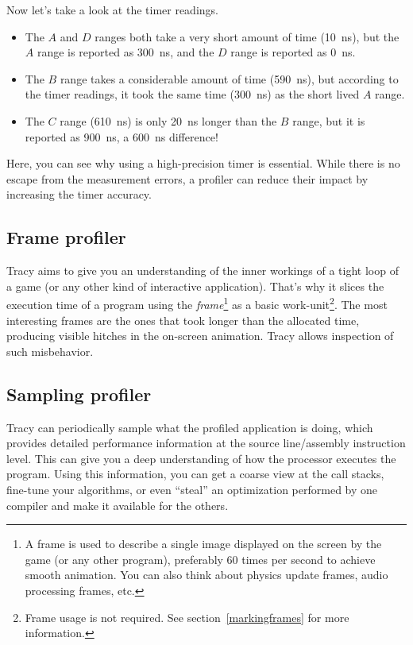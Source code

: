 \documentclass[hidelinks,titlepage,a4paper,twoside]{article}
\begin{document}
Now let's take a look at the timer readings.

\begin{itemize}
\item The $A$ and $D$ ranges both take a very short amount of time (10~\si{\nano\second}), but the $A$ range is reported as 300~\si{\nano\second}, and the $D$ range is reported as 0~\si{\nano\second}.
\item The $B$ range takes a considerable amount of time (590~\si{\nano\second}), but according to the timer readings, it took the same time (300~\si{\nano\second}) as the short lived $A$ range.
\item The $C$ range (610~\si{\nano\second}) is only 20~\si{\nano\second} longer than the $B$ range, but it is reported as 900~\si{\nano\second}, a 600~\si{\nano\second} difference!
\end{itemize}

Here, you can see why using a high-precision timer is essential. While there is no escape from the measurement errors, a profiler can reduce their impact by increasing the timer accuracy.

\subsection{Frame profiler}

Tracy aims to give you an understanding of the inner workings of a tight loop of a game (or any other kind of interactive application). That's why it slices the execution time of a program using the \emph{frame}\footnote{A frame is used to describe a single image displayed on the screen by the game (or any other program), preferably 60 times per second to achieve smooth animation. You can also think about physics update frames, audio processing frames, etc.} as a basic work-unit\footnote{Frame usage is not required. See section~\ref{markingframes} for more information.}. The most interesting frames are the ones that took longer than the allocated time, producing visible hitches in the on-screen animation. Tracy allows inspection of such misbehavior.

\subsection{Sampling profiler}

Tracy can periodically sample what the profiled application is doing, which provides detailed performance information at the source line/assembly instruction level. This can give you a deep understanding of how the processor executes the program. Using this information, you can get a coarse view at the call stacks, fine-tune your algorithms, or even \enquote{steal} an optimization performed by one compiler and make it available for the others.
\end{document}

